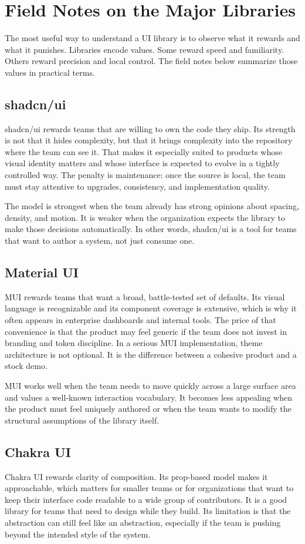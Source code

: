\documentclass[11pt,twoside,a4paper]{article}
\begin{document}
\section{Field Notes on the Major Libraries}
The most useful way to understand a UI library is to observe what it rewards and what it punishes. Libraries encode values. Some reward speed and familiarity. Others reward precision and local control. The field notes below summarize those values in practical terms.

\subsection{shadcn/ui}
shadcn/ui rewards teams that are willing to own the code they ship. Its strength is not that it hides complexity, but that it brings complexity into the repository where the team can see it. That makes it especially suited to products whose visual identity matters and whose interface is expected to evolve in a tightly controlled way. The penalty is maintenance: once the source is local, the team must stay attentive to upgrades, consistency, and implementation quality.

The model is strongest when the team already has strong opinions about spacing, density, and motion. It is weaker when the organization expects the library to make those decisions automatically. In other words, shadcn/ui is a tool for teams that want to author a system, not just consume one.

\subsection{Material UI}
MUI rewards teams that want a broad, battle-tested set of defaults. Its visual language is recognizable and its component coverage is extensive, which is why it often appears in enterprise dashboards and internal tools. The price of that convenience is that the product may feel generic if the team does not invest in branding and token discipline. In a serious MUI implementation, theme architecture is not optional. It is the difference between a cohesive product and a stock demo.

MUI works well when the team needs to move quickly across a large surface area and values a well-known interaction vocabulary. It becomes less appealing when the product must feel uniquely authored or when the team wants to modify the structural assumptions of the library itself.

\subsection{Chakra UI}
Chakra UI rewards clarity of composition. Its prop-based model makes it approachable, which matters for smaller teams or for organizations that want to keep their interface code readable to a wide group of contributors. It is a good library for teams that need to design while they build. Its limitation is that the abstraction can still feel like an abstraction, especially if the team is pushing beyond the intended style of the system.
\end{document}

